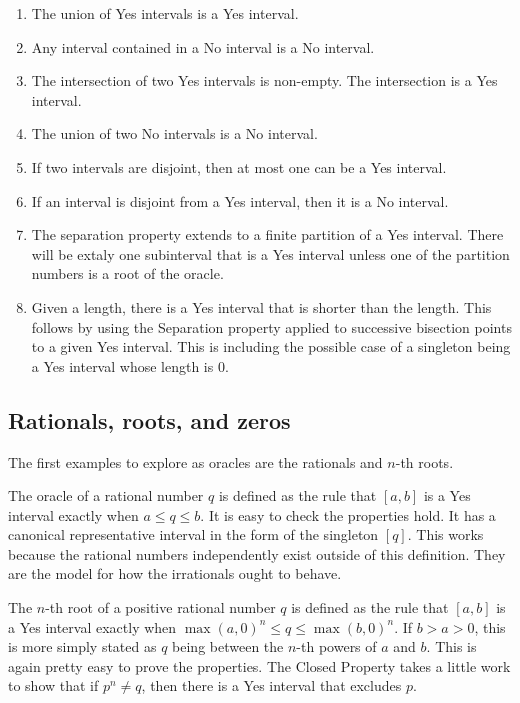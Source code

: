 \documentclass[12pt]{article}
\theoremstyle{remark}
\begin{document}
\begin{enumerate}
    \item The union of Yes intervals is a Yes interval. 
    \item Any interval contained in a No interval is a No interval. 
    \item The intersection of two Yes intervals is non-empty. The intersection is a Yes interval. 
    \item The union of two No intervals is a No interval. 
    \item If two intervals are disjoint, then at most one can be a Yes interval. 
    \item If an interval is disjoint from a Yes interval, then it is a No interval. 
    \item The separation property extends to a finite partition of a Yes interval. There will be extaly one subinterval that is a Yes interval unless one of the partition numbers is a root of the oracle.   
    \item Given a length, there is a Yes interval that is shorter than the length. This follows by using the Separation property applied to successive bisection points to a given Yes interval. This is including the possible case of a singleton being a Yes interval whose length is 0. 
\end{enumerate}

\subsection{Rationals, roots, and zeros}

The first examples to explore as oracles are the rationals and $n$-th roots. 

The oracle of a rational number $q$ is defined as the rule that $[a,b]$ is a Yes interval exactly when $a \leq q \leq b$. It is easy to check the properties hold. It has a canonical representative interval in the form of the singleton $[q]$. This works because the rational numbers independently exist outside of this definition. They are the model for how the irrationals ought to behave.  

The $n$-th root of a positive rational number $q$ is defined as the rule that $[a,b]$ is a Yes interval exactly when $\max(a, 0)^n \leq q \leq \max(b,0)^n$. If $b > a> 0$, this is more simply stated as $q$ being between the $n$-th powers of $a$ and $b$. This is again pretty easy to prove the properties. The Closed Property takes a little work to show that if $p^n \neq q$, then there is a Yes interval that excludes $p$. 
\end{document}
